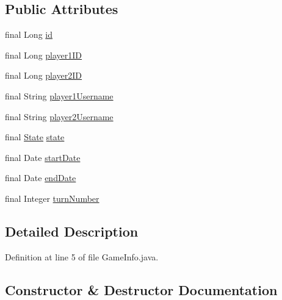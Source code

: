 \subsection*{Public Attributes}
\begin{DoxyCompactItemize}
\item 
final Long \hyperlink{classsharedlib_1_1tuples_1_1_game_info_a26ad60530e62a05f87c0703818898ebe}{id}
\item 
final Long \hyperlink{classsharedlib_1_1tuples_1_1_game_info_af5d977e3c705e0db8a0ab8dec4f353ed}{player1\+ID}
\item 
final Long \hyperlink{classsharedlib_1_1tuples_1_1_game_info_aa3a82b92a42c7b61c18e2a214bc5a099}{player2\+ID}
\item 
final String \hyperlink{classsharedlib_1_1tuples_1_1_game_info_a89da4ca1f9dd359190862a3aae14bdbe}{player1\+Username}
\item 
final String \hyperlink{classsharedlib_1_1tuples_1_1_game_info_ad5af3fd8e58b7bdb34326ec50accf0e6}{player2\+Username}
\item 
final \hyperlink{enumsharedlib_1_1tuples_1_1_game_info_1_1_state}{State} \hyperlink{classsharedlib_1_1tuples_1_1_game_info_afc333badb334883013fd65eeb7d4fd80}{state}
\item 
final Date \hyperlink{classsharedlib_1_1tuples_1_1_game_info_abb7d07e4ce3a419b45134234b312d4a3}{start\+Date}
\item 
final Date \hyperlink{classsharedlib_1_1tuples_1_1_game_info_a36b010041256c5e2e1d006ef2c6edf68}{end\+Date}
\item 
final Integer \hyperlink{classsharedlib_1_1tuples_1_1_game_info_a71de1ad6ea2bfc9eb4b498c57b04c55c}{turn\+Number}
\end{DoxyCompactItemize}


\subsection{Detailed Description}


Definition at line 5 of file Game\+Info.\+java.



\subsection{Constructor \& Destructor Documentation}
\hypertarget{classsharedlib_1_1tuples_1_1_game_info_ae481f1247dcb371c2fe48b372cb84219}{}\label{classsharedlib_1_1tuples_1_1_game_info_ae481f1247dcb371c2fe48b372cb84219} 
